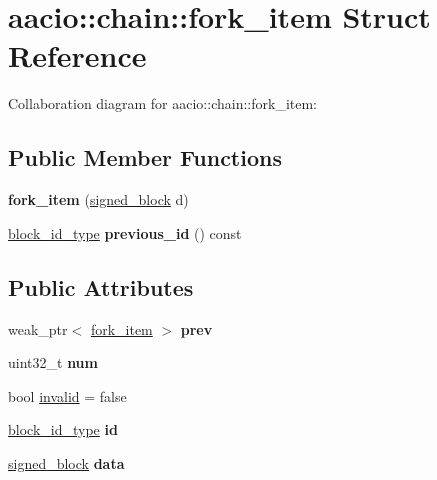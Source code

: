 \hypertarget{structaacio_1_1chain_1_1fork__item}{}\section{aacio\+:\+:chain\+:\+:fork\+\_\+item Struct Reference}
\label{structaacio_1_1chain_1_1fork__item}


Collaboration diagram for aacio\+:\+:chain\+:\+:fork\+\_\+item\+:
\subsection*{Public Member Functions}
\begin{DoxyCompactItemize}
\item 
\mbox{\label{structaacio_1_1chain_1_1fork__item_a0a9c4a86553f71de806478f6062160aa}} 
{\bfseries fork\+\_\+item} (\mbox{\hyperlink{structaacio_1_1chain_1_1signed__block}{signed\+\_\+block}} d)
\item 
\mbox{\label{structaacio_1_1chain_1_1fork__item_a4ce4f4cc468ffe132a0fc351d653516d}} 
\mbox{\hyperlink{classfc_1_1sha256}{block\+\_\+id\+\_\+type}} {\bfseries previous\+\_\+id} () const
\end{DoxyCompactItemize}
\subsection*{Public Attributes}
\begin{DoxyCompactItemize}
\item 
\mbox{\label{structaacio_1_1chain_1_1fork__item_ad49cc1230677347c782d421df55ac526}} 
weak\+\_\+ptr$<$ \mbox{\hyperlink{structaacio_1_1chain_1_1fork__item}{fork\+\_\+item}} $>$ {\bfseries prev}
\item 
\mbox{\label{structaacio_1_1chain_1_1fork__item_a5b6cd86a516f4b204d3969d13614e204}} 
uint32\+\_\+t {\bfseries num}
\item 
bool \mbox{\hyperlink{structaacio_1_1chain_1_1fork__item_a53c5fc406e0945f419355f0f76b76992}{invalid}} = false
\item 
\mbox{\label{structaacio_1_1chain_1_1fork__item_af342e491caaca27d92f2d4ec732ead3f}} 
\mbox{\hyperlink{classfc_1_1sha256}{block\+\_\+id\+\_\+type}} {\bfseries id}
\item 
\mbox{\label{structaacio_1_1chain_1_1fork__item_ac28eee0f7d68875ce96d10fd4fce5973}} 
\mbox{\hyperlink{structaacio_1_1chain_1_1signed__block}{signed\+\_\+block}} {\bfseries data}
\end{DoxyCompactItemize}


